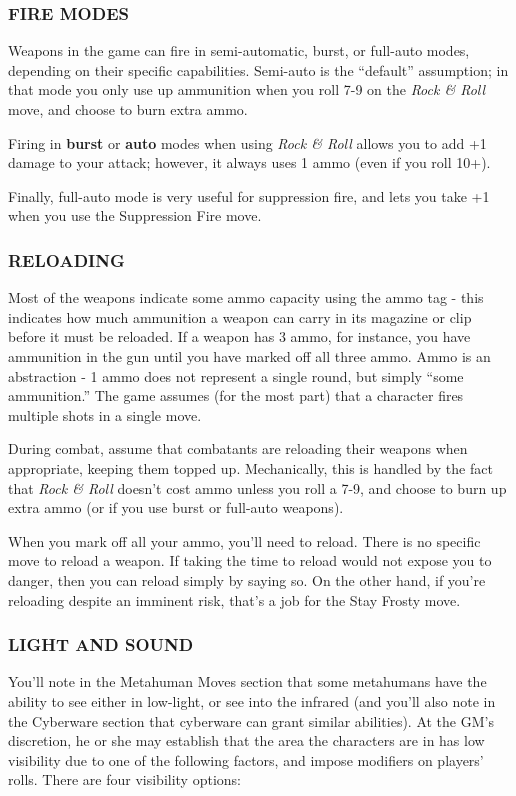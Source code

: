 \documentclass[oneside,10pt]{article}
\begin{document}
\begin{multicols}{2}
\subsubsection{FIRE MODES}
Weapons in the game can fire in semi-automatic, burst, or
full-auto modes, depending on their specific capabilities.
Semi-auto is the “default” assumption; in that mode you only
use up ammunition when you roll 7-9 on the \textit{Rock \& Roll}
move, and choose to burn extra ammo.

Firing in \textbf{burst} or \textbf{auto} modes when using \textit{Rock \& Roll} allows
you to add +1 damage to your attack; however, it always
uses 1 ammo (even if you roll 10+).

Finally, full-auto mode is very useful for suppression fire, and
lets you take +1 when you use the Suppression Fire move.


\subsubsection{RELOADING}
Most of the weapons indicate some ammo capacity using the
ammo tag - this indicates how much ammunition a weapon
can carry in its magazine or clip before it must be reloaded.
If a weapon has 3 ammo, for instance, you have ammunition in the gun until you have marked off all three ammo.
Ammo is an abstraction - 1 ammo does not represent a single
round, but simply “some ammunition.” The game assumes
(for the most part) that a character fires multiple shots in a
single move.

During combat, assume that combatants are reloading their
weapons when appropriate, keeping them topped up. Mechanically, this is handled by the fact that \textit{Rock \& Roll} doesn’t
cost ammo unless you roll a 7-9, and choose to burn up extra
ammo (or if you use burst or full-auto weapons).

When you mark off all your ammo, you’ll need to reload.
There is no specific move to reload a weapon. If taking the
time to reload would not expose you to danger, then you
can reload simply by saying so. On the other hand, if you’re
reloading despite an imminent risk, that’s a job for the Stay
Frosty move.


\subsubsection{LIGHT AND SOUND}
You’ll note in the Metahuman Moves section that some metahumans have the ability to see either in low-light, or see into
the infrared (and you’ll also note in the Cyberware section that
cyberware can grant similar abilities). At the GM’s discretion,
he or she may establish that the area the characters are in has
low visibility due to one of the following factors, and impose
modifiers on players’ rolls. There are four
visibility options:
\begin{adjustwidth*}{.5cm}{.5cm}


\end{adjustwidth*}
\end{multicols}
\end{document}
